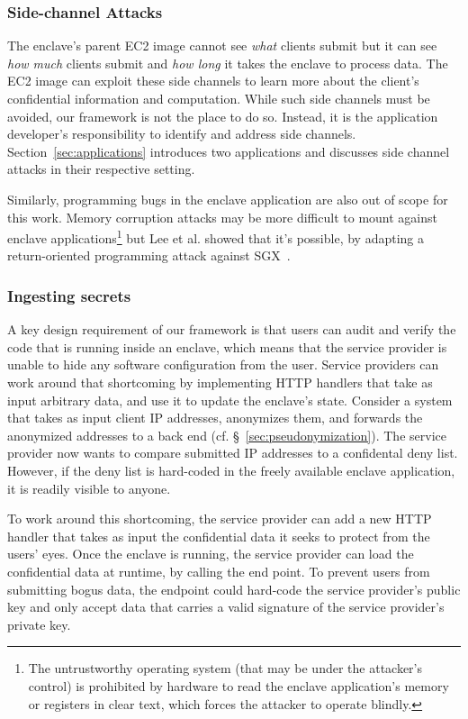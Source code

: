 \subsubsection{Side-channel Attacks}
\label{sec:side-channels}

The enclave's parent EC2 image cannot see \emph{what} clients submit but it can
see \emph{how much} clients submit and \emph{how long} it takes the enclave to
process data.  The EC2 image can exploit these side channels to learn more
about the client's confidential information and computation.  While such side
channels must be avoided, our framework is not the place to do so.  Instead, it
is the application developer's responsibility to identify and address side
channels.  Section~\ref{sec:applications} introduces two applications and
discusses side channel attacks in their respective setting.

Similarly, programming bugs in the enclave application are also out of scope for
this work.  Memory corruption attacks may be more difficult to mount against
enclave applications\footnote{The untrustworthy operating system (that may be
under the attacker's control) is prohibited by hardware to read the enclave
application's memory or registers in clear text, which forces the attacker to
operate blindly.} but Lee et al. showed that it's possible, by adapting a
return-oriented programming attack against SGX~\cite{Lee2017a}.

\subsubsection{Ingesting secrets}
\label{sec:secrets}

A key design requirement of our framework is that users can audit and verify the
code that is running inside an enclave, which means that the service provider is
unable to hide any software configuration from the user.  Service providers can
work around that shortcoming by implementing HTTP handlers that take as input
arbitrary data, and use it to update the enclave's state.  Consider a system
that takes as input client IP addresses, anonymizes them, and forwards the
anonymized addresses to a back end (cf. \S~\ref{sec:pseudonymization}).  The
service provider now wants to compare submitted IP addresses to a confidental
deny list.  However, if the deny list is hard-coded in the freely available
enclave application, it is readily visible to anyone.

To work around this shortcoming, the service provider can add a new HTTP handler
that takes as input the confidential data it seeks to protect from the users'
eyes.  Once the enclave is running, the service provider can load the
confidential data at runtime, by calling the end point.  To prevent users from
submitting bogus data, the endpoint could hard-code the service provider's
public key and only accept data that carries a valid signature of the service
provider's private key.

